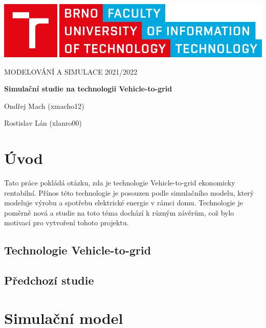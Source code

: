 \documentclass[12pt,a4paper]{article}
\begin{document}
\begin{titlepage}
\begin{center}
\includegraphics[width=0.5\linewidth]{img/logo.pdf}
\vspace{3cm}

\LARGE\uppercase{Modelování a simulace 2021/2022}
\vspace{1cm}

\LARGE\textbf{Simulační studie na technologii Vehicle-to-grid}

\vspace*{\fill}
\large{Ondřej Mach (xmacho12)}

\large{Rostislav Lán (xlanro00)}

\end{center}
\end{titlepage}


\setcounter{page}{1}
\tableofcontents
\clearpage


\section{Úvod}
Tato práce pokládá otázku, zda je technologie Vehicle-to-grid ekonomicky rentabilní.
Přínos této technologie je posouzen podle simulačního modelu, který modeluje výrobu a spotřebu elektrické energie v rámci domu.
Technologie je poměrně nová a studie na toto téma dochází k různým závěrům, což bylo motivací pro vytvoření tohoto projektu.

\subsection{Technologie Vehicle-to-grid}

\subsection{Předchozí studie}

\section{Simulační model}
\end{document}
